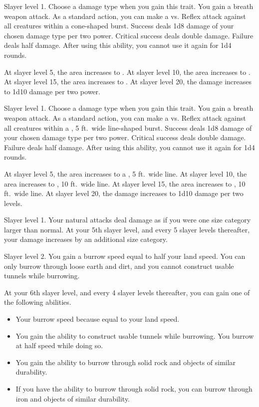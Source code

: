     \featpre Slayer level 1.
     Choose a damage type when you gain this trait.
    \featben You gain a breath weapon attack.
    As a standard action, you can make a  vs. Reflex attack against all creatures within a \areasmall cone-shaped burst.
    Success deals 1d8 damage of your chosen damage type per two power.
    Critical success deals double damage.
    Failure deals half damage.
    After using this ability, you cannot use it again for 1d4 rounds.

    At slayer level 5, the area increases to \areamed.
    At slayer level 10, the area increases to \arealarge.
    At slayer level 15, the area increases to \areahuge.
    At slayer level 20, the damage increases to 1d10 damage per two power.

    \featpre Slayer level 1.
     Choose a damage type when you gain this trait.
    \featben You gain a breath weapon attack.
    As a standard action, you can make a  vs. Reflex attack against all creatures within a \areamed, 5 ft.\ wide line-shaped burst.
    Success deals 1d8 damage of your chosen damage type per two power.
    Critical success deals double damage.
    Failure deals half damage.
    After using this ability, you cannot use it again for 1d4 rounds.

    At slayer level 5, the area increases to a \arealarge, 5 ft.\ wide line.
    At slayer level 10, the area increases to \arealarge, 10 ft.\ wide line.
    At slayer level 15, the area increases to \areahuge, 10 ft.\ wide line.
    At slayer level 20, the damage increases to 1d10 damage per two levels.

    \featpre Slayer level 1.
    \featben Your natural attacks deal damage as if you were one size category larger than normal.
    At your 5th slayer level, and every 5 slayer levels thereafter, your damage increases by an additional size category.

    \featpre Slayer level 2.
    \featben You gain a burrow speed equal to half your land speed.
    You can only burrow through loose earth and dirt, and you cannot construct usable tunnels while burrowing.

    At your 6th slayer level, and every 4 slayer levels thereafter, you can gain one of the following abilities.
    \begin{itemize}
        \item Your burrow speed because equal to your land speed.
        \item You gain the ability to construct usable tunnels while burrowing.
            You burrow at half speed while doing so.
        \item You gain the ability to burrow through solid rock and objects of similar durability.
        \item If you have the ability to burrow through solid rock, you can burrow through iron and objects of similar durability.
    \end{itemize}

